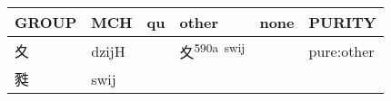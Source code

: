 \documentclass[14pt,a4paper]{scrartcl}
\begin{document}
\begin{longtable}[c]{@{}llllll@{}}
\toprule
\begin{minipage}[b]{0.14\columnwidth}\raggedright\strut
GROUP
\strut\end{minipage} &
\begin{minipage}[b]{0.14\columnwidth}\raggedright\strut
MCH
\strut\end{minipage} &
\begin{minipage}[b]{0.14\columnwidth}\raggedright\strut
qu
\strut\end{minipage} &
\begin{minipage}[b]{0.14\columnwidth}\raggedright\strut
other
\strut\end{minipage} &
\begin{minipage}[b]{0.14\columnwidth}\raggedright\strut
none
\strut\end{minipage} &
\begin{minipage}[b]{0.14\columnwidth}\raggedright\strut
PURITY
\strut\end{minipage}\tabularnewline
\midrule
\endhead
\begin{minipage}[t]{0.14\columnwidth}\raggedright\strut
夊
\strut\end{minipage} &
\begin{minipage}[t]{0.14\columnwidth}\raggedright\strut
dzijH
\strut\end{minipage} &
\begin{minipage}[t]{0.14\columnwidth}\raggedright\strut
\strut\end{minipage} &
\begin{minipage}[t]{0.14\columnwidth}\raggedright\strut
夊\textsuperscript{590a~swij}
\strut\end{minipage} &
\begin{minipage}[t]{0.14\columnwidth}\raggedright\strut
\strut\end{minipage} &
\begin{minipage}[t]{0.14\columnwidth}\raggedright\strut
pure:other
\strut\end{minipage}\tabularnewline
\begin{minipage}[t]{0.14\columnwidth}\raggedright\strut
甤
\strut\end{minipage} &
\begin{minipage}[t]{0.14\columnwidth}\raggedright\strut
swij
\strut\end{minipage} &
\begin{minipage}[t]{0.14\columnwidth}\raggedright\strut
\strut\end{minipage} &

\end{longtable}
\end{document}

